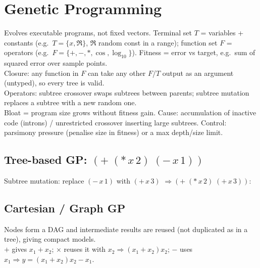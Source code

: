 \section{Genetic Programming}
Evolves executable programs, not fixed vectors. Terminal set \(T\) = variables + constants (e.g.\ \(T=\{x,\Re\}\), \(\Re\) random const in a range); function set \(F\) = operators (e.g.\ \(F=\{+,-,\ast,\cos,\log_{10}\}\)). Fitness = error vs target, e.g.\ sum of squared error over sample points.\\
Closure: any function in \(F\) can take any other \(F\)/\(T\) output as an argument (untyped), so every tree is valid.\\
Operators: subtree crossover swaps subtrees between parents; subtree mutation replaces a subtree with a new random one.\\
Bloat = program size grows without fitness gain. Cause: accumulation of inactive code (introns) / unrestricted crossover inserting large subtrees. Control: parsimony pressure (penalise size in fitness) or a max depth/size limit.

\subsection*{Tree-based GP: \((+\;(\ast\,x\,2)\;(-\,x\,1))\)}
Subtree mutation: replace \((-\,x\,1)\) with \((+\,x\,3)\) \(\Rightarrow (+\;(\ast\,x\,2)\;(+\,x\,3))\):

\subsection*{Cartesian / Graph GP}
Nodes form a DAG and intermediate results are reused (not duplicated as in a tree), giving compact models.\\
\(+\) gives \(x_1+x_2\); \(\times\) reuses it with \(x_2\Rightarrow(x_1+x_2)x_2\); \(-\) uses \(x_1\Rightarrow y=(x_1+x_2)x_2-x_1\).

